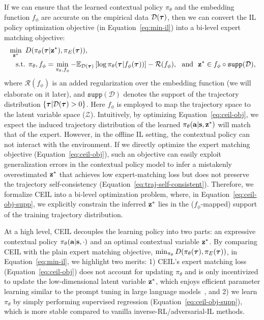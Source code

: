 If we can ensure that the learned contextual policy $\pi_\theta$ and the embedding function $f_\phi$ are accurate on the empirical data $\mathcal{D}({\bm{\tau}})$, then we can convert the IL policy optimization objective (in Equation~\ref{eq:min-il}) into a bi-level expert matching objective: 
\begin{align}
	&\min_{\bz^*} \ D(\pi_\theta(\btau|\bz^*), \pi_E(\btau)), \label{eq:ceil-obj} \\ 
	&\quad \text{s.t. } \pi_\theta, f_\phi = \min_{\pi_\theta, f_\phi}  - \mathbb{E}_{\mathcal{D}(\btau)}  \lbr \log \pi_\theta(\btau|{f_\phi}(\btau))\rbr - \mathcal{R}(f_\phi), \ \  \text{and} \ \  \bz^* \in {f_\phi} \circ \texttt{supp}(\mathcal{D}), \label{eq:ceil-obj-supp}
\end{align}
where $\mathcal{R}(f_\phi)$ is an added regularization over the embedding function (we will elaborate on it later), and $\texttt{supp}(\mathcal{D})$ denotes the support of the trajectory distribution $\{ {\bm{\tau}} | \mathcal{D}({\bm{\tau}})>0 \}$. Here ${f_\phi}$ is employed to map the trajectory space to the latent variable space ($\mathcal{Z}$). 
Intuitively, by optimizing Equation~\ref{eq:ceil-obj}, we expect the induced trajectory distribution of the learned $\pi_\theta(\mathbf{a}|\mathbf{s}, {\mathbf{z}}^*)$ will match that of the expert. 
However, 
in the offline IL setting, the contextual policy can not interact with the environment. 
If we directly optimize the expert matching objective (Equation~\ref{eq:ceil-obj}), such an objective can easily exploit generalization errors in the contextual policy model to infer a mistakenly overestimated ${\mathbf{z}}^*$ that achieves low expert-matching loss but does not preserve the trajectory self-consistency (Equation~\ref{eq:traj-self-consistent}). Therefore, we formalize CEIL into a bi-level optimization problem, where, in Equation~\ref{eq:ceil-obj-supp}, we explicitly constrain the inferred ${\mathbf{z}}^*$ lies in the (${f_\phi}$-mapped) support of the training trajectory distribution. 

At a high level, CEIL decouples the learning policy into two parts: an expressive contextual policy $\pi_\theta(\mathbf{a}|\mathbf{s}, \cdot)$ and an optimal contextual variable ${\mathbf{z}}^*$. 
By comparing CEIL with the plain expert matching objective, $\min_{\pi_\theta} D(\pi_\theta({\bm{\tau}}), \pi_E({\bm{\tau}}))$, in Equation~\ref{eq:min-il}, we highlight two merits: 1) CEIL's expert matching loss (Equation~\ref{eq:ceil-obj}) does not account for updating $\pi_\theta$ and is only incentivized to update the low-dimensional latent variable ${\mathbf{z}}^*$, which enjoys efficient parameter learning similar to the prompt tuning in large language models~\citep{zhou2022learning}, and 2) we learn $\pi_\theta$ by simply performing supervised regression (Equation~\ref{eq:ceil-obj-supp}), which is more stable compared to vanilla inverse-RL/adversarial-IL methods.






